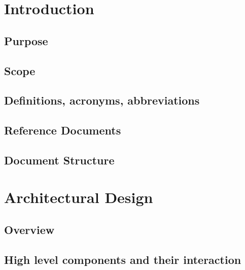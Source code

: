 \documentclass[12pt, a4paper]{article}
\title{
	\Huge{\textbf{\centerline{myTaxiService}}}
	\newline
	\huge{\textbf{D}esign \textbf{D}ocument}
}
\author{
	Monica Magoni 854091
	\\
	Alberto Cibari 852689
}
\date{\today}
\begin{document}
	\maketitle
	\newpage
	\renewcommand*\contentsname{\Huge{Contents}}
	\tableofcontents
	
	\newpage
	
    \section{Introduction}
    	
    	\subsection{Purpose}
    	
    	
    	\subsection{Scope}
    	
    	\subsection{Definitions, acronyms, abbreviations}
    	
    
        \subsection{Reference Documents}
    	
    
    	\subsection{Document Structure}
    	
    	
    	
    \newpage
    \section{Architectural Design}
    
    	\subsection{Overview}
    	
    	\subsection{High level components and their interaction}
    	
 
\end{document}
